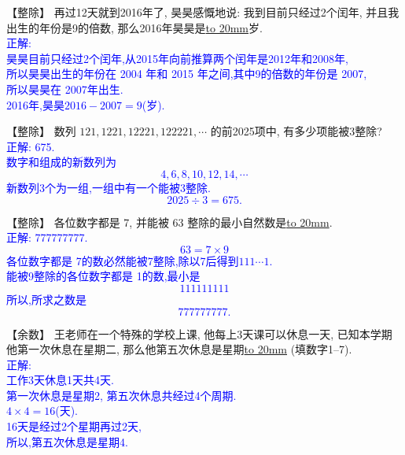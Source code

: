 
\item {
    【整除】
    再过12天就到2016年了, 昊昊感慨地说: 我到目前只经过2个闰年, 并且我出生的年份是9的倍数, 那么2016年昊昊是\underline{\hbox to 20mm{}}岁. 
    \ifshowSolution 
        \fangsong{}\textcolor{blue}{
            \\正解: \\
            昊昊目前只经过2个闰年,从2015年向前推算两个闰年是2012年和2008年,\\
            所以昊昊出生的年份在 2004 年和 2015 年之间,其中9的倍数的年份是 2007,\\
            所以昊昊在 2007年出生.\\
            2016年,昊昊$2016-2007=9$(岁).
        }
    \else
        \vspace{1cm}
    \fi
}

\item {
    【整除】
    数列 $121, 1221, 12221, 122221,\cdots$ 的前2025项中, 有多少项能被3整除? 
    \ifshowSolution
        \\\fangsong{}\textcolor{blue}{
            正解: 675.\\
            数字和组成的新数列为
            \[
                4,6,8,10,12,14,\cdots
            \]
            新数列3个为一组,一组中有一个能被3整除.
            \[
                2025\div 3 = 675.
            \]
        }
    \else
        \vspace{1cm}
    \fi
}

\item {
    【整除】
    各位数字都是 7, 并能被 63 整除的最小自然数是\underline{\hbox to 20mm{}}.
    \ifshowSolution
        \\\fangsong{}\textcolor{blue}{
            正解: 777777777.
            \[
                63 = 7\times 9
            \]
            各位数字都是 7的数必然能被7整除,除以7后得到$111\cdots 1$.\\
            能被9整除的各位数字都是 1的数,最小是 
            \[111111111\]
            所以,所求之数是
            \[777777777.\]
        }
    \else
        \vspace{1cm}
    \fi
}

\item {
    【余数】
    王老师在一个特殊的学校上课, 他每上3天课可以休息一天, 已知本学期他第一次休息在星期二, 那么他第五次休息是星期\underline{\hbox to 20mm{}} (填数字1--7).
    \ifshowSolution
        \\\fangsong{}\textcolor{blue}{
            正解: \\
            工作3天休息1天共4天.\\
            第一次休息是星期2, 第五次休息共经过4个周期.\\
            $4\times 4=16$(天).\\
            16天是经过2个星期再过2天,\\
            所以,第五次休息是星期4.
        }
    \else
        \vspace{1cm}
    \fi
}

